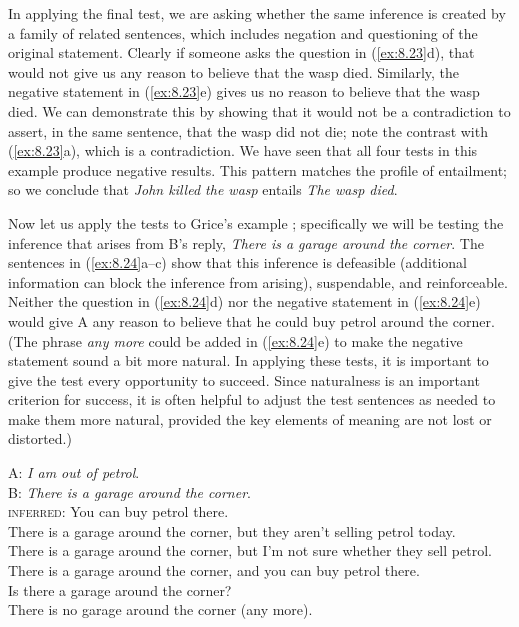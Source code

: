 In applying the final test, we are asking whether the same inference is created by a family of related sentences, which includes negation and questioning of the original statement. Clearly if someone asks the question in (\ref{ex:8.23}d), that would not give us any reason to believe that the wasp died. Similarly, the negative statement in (\ref{ex:8.23}e) gives us no reason to believe that the wasp died. We can demonstrate this by showing that it would not be a contradiction to assert, in the same sentence, that the wasp did not die; note the contrast with (\ref{ex:8.23}a), which is a contradiction. We have seen that all four tests in this example produce negative results. This pattern matches the profile of entailment; so we conclude that \textit{John killed the wasp} entails \textit{The wasp died}.



Now let us apply the tests to Grice’s example ; specifically we will be testing the inference that arises from B’s reply, \textit{There is a garage around the corner}. The sentences in (\ref{ex:8.24}a--c) show that this inference is defeasible (additional information can block the inference from arising), suspendable, and reinforceable. Neither the question in (\ref{ex:8.24}d) nor the negative statement in (\ref{ex:8.24}e) would give A any reason to believe that he could buy petrol around the corner. (The phrase \textit{any more} could be added in (\ref{ex:8.24}e) to make the negative statement sound a bit more natural. In applying these tests, it is important to give the test every opportunity to succeed. Since naturalness is an important criterion for success, it is often helpful to adjust the test sentences as needed to make them more natural, provided the key elements of meaning are not lost or distorted.)


\ea \label{ex:8.24}
A: \textit{I am out of petrol}.\\
B: \textit{There is a garage around the corner}.\\
\textsc{inferred}: You can buy petrol there.\\
\ea There is a garage around the corner, but they aren’t selling petrol today.\\
\ex There is a garage around the corner, but I’m not sure whether they sell petrol.\\
\ex There is a garage around the corner, and you can buy petrol there.\\
\ex Is there a garage around the corner?\\
\ex There is no garage around the corner (any more).
                       \z
\z


